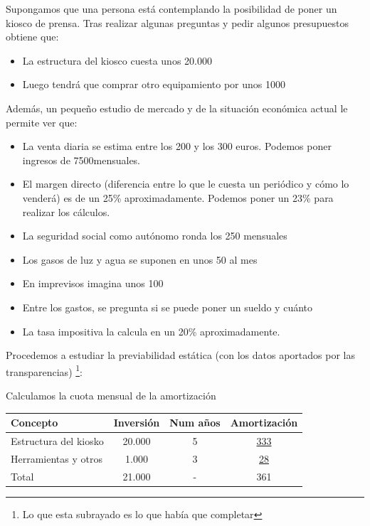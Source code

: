 \documentclass[nochap,palatino,shortheader]{apuntes}
\begin{document}
\begin{example}
Supongamos que una persona está contemplando la posibilidad de poner un kiosco de prensa. Tras realizar algunas preguntas y pedir algunos presupuestos obtiene que:

\begin{itemize}
\item La estructura del kiosco cuesta unos 20.000 \texteuro
\item Luego tendrá que comprar otro equipamiento por unos 1000 \texteuro
\end{itemize}


Además, un pequeño estudio de mercado y de la situación económica actual le permite ver que:
\begin{itemize}
\item La venta diaria se estima entre los 200 y los 300 euros.
Podemos poner ingresos de 7500\texteuro mensuales.

\item El margen directo (diferencia entre lo que le cuesta un periódico y cómo lo venderá) es de un 25\% aproximadamente.
Podemos poner un 23\% para realizar los cálculos.

\item La seguridad social como autónomo ronda los 250 \texteuro mensuales

\item Los gasos de luz y agua se suponen en unos 50 \texteuro al mes

\item En imprevisos imagina unos 100 \texteuro

\item Entre los gastos, se pregunta si se puede poner un sueldo y cuánto

\item La tasa impositiva la calcula en un 20\% aproximadamente.
\end{itemize}

Procedemos a estudiar la previabilidad estática (con los datos aportados por las transparencias) \footnote{Lo que esta subrayado es lo que había que completar}:


\begin{center}
Calculamos la cuota mensual de la amortización
\end{center}

\begin{center}
\normalfont\small
\begin{tabular}{l|c|c|c}
\textbf{Concepto} & \textbf{Inversión} & \textbf{Num años} & \textbf{Amortización} \\
\toprule
Estructura del kiosko & 20.000 & 5 & \underline{333}\\
Herramientas y otros & 1.000 & 3 & \underline{28} \\
\bottomrule
Total &21.000  & - & 361 \\
\end{tabular}
\end{center}


\end{example}
\end{document}
